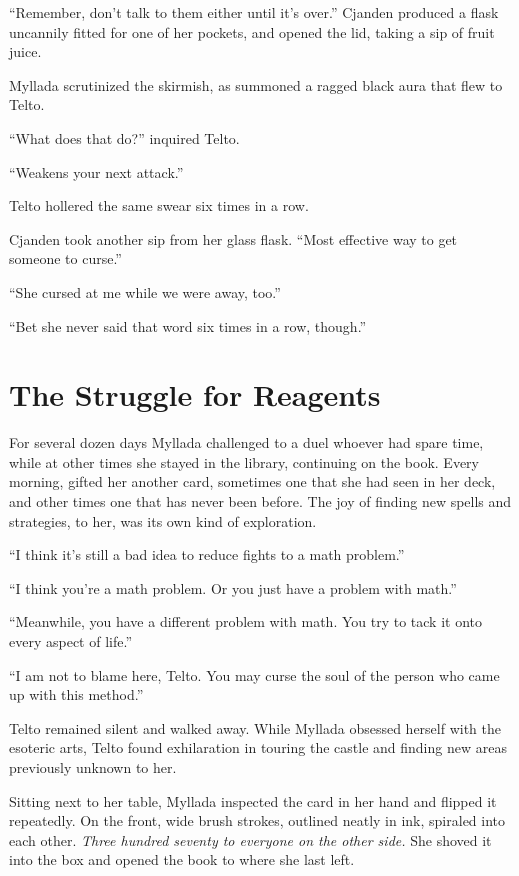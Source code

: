 ``Remember, don't talk to them either until it's over.'' Cjanden produced a flask uncannily fitted for one of her pockets, and opened the lid, taking a sip of fruit juice.

Myllada scrutinized the skirmish, as \yronsyncra summoned a ragged black aura that flew to Telto.

``What does that do?'' inquired Telto.

``Weakens your next attack.''

Telto hollered the same swear six times in a row.

Cjanden took another sip from her glass flask. ``Most effective way to get someone to curse.''

``She cursed at me while we were away, too.''

``Bet she never said that word six times in a row, though.''

\chapter{The Struggle for Reagents}

For several dozen days Myllada challenged to a duel whoever had spare time, while at other times she stayed in the library, continuing on the book. Every morning, \yronsyncra{} gifted her another card, sometimes one that she had seen in her deck, and other times one that has never been before. The joy of finding new spells and strategies, to her, was its own kind of exploration.

``I think it's still a bad idea to reduce fights to a math problem.''

``I think you're a math problem. Or you just have a problem with math.''

``Meanwhile, you have a different problem with math. You try to tack it onto every aspect of life.''

``I am not to blame here, Telto. You may curse the soul of the person who came up with this method.''

Telto remained silent and walked away. While Myllada obsessed herself with the esoteric arts, Telto found exhilaration in touring the castle and finding new areas previously unknown to her.

Sitting next to her table, Myllada inspected the card in her hand and flipped it repeatedly. On the front, wide brush strokes, outlined neatly in ink, spiraled into each other. \emph{Three hundred seventy to everyone on the other side.} She shoved it into the box and opened the book to where she last left.

